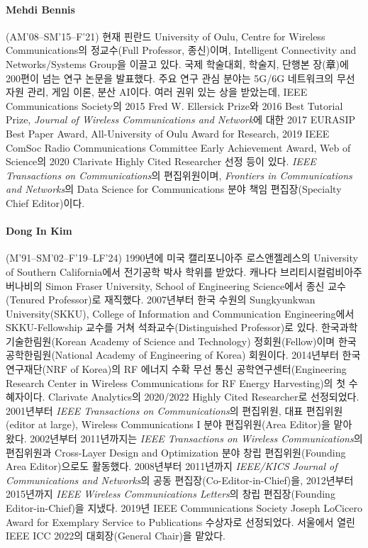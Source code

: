 \paragraph{Mehdi Bennis} (AM'08--SM'15--F'21)
현재 핀란드 University of Oulu, Centre for Wireless Communications의 정교수(Full Professor, 종신)이며, Intelligent Connectivity and Networks/Systems Group을 이끌고 있다.
국제 학술대회, 학술지, 단행본 장(章)에 200편이 넘는 연구 논문을 발표했다.
주요 연구 관심 분야는 5G/6G 네트워크의 무선 자원 관리, 게임 이론, 분산 AI이다.
여러 권위 있는 상을 받았는데, IEEE Communications Society의 2015 Fred W. Ellersick Prize와 2016 Best Tutorial Prize, \emph{Journal of Wireless Communications and Network}에 대한 2017 EURASIP Best Paper Award, All-University of Oulu Award for Research, 2019 IEEE ComSoc Radio Communications Committee Early Achievement Award, Web of Science의 2020 Clarivate Highly Cited Researcher 선정 등이 있다.
\emph{IEEE Transactions on Communications}의 편집위원이며, \emph{Frontiers in Communications and Networks}의 Data Science for Communications 분야 책임 편집장(Specialty Chief Editor)이다.

\paragraph{Dong In Kim} (M'91--SM'02--F'19--LF'24)
1990년에 미국 캘리포니아주 로스앤젤레스의 University of Southern California에서 전기공학 박사 학위를 받았다.
캐나다 브리티시컬럼비아주 버나비의 Simon Fraser University, School of Engineering Science에서 종신 교수(Tenured Professor)로 재직했다.
2007년부터 한국 수원의 Sungkyunkwan University(SKKU), College of Information and Communication Engineering에서 SKKU-Fellowship 교수를 거쳐 석좌교수(Distinguished Professor)로 있다.
한국과학기술한림원(Korean Academy of Science and Technology) 정회원(Fellow)이며 한국공학한림원(National Academy of Engineering of Korea) 회원이다.
2014년부터 한국연구재단(NRF of Korea)의 RF 에너지 수확 무선 통신 공학연구센터(Engineering Research Center in Wireless Communications for RF Energy Harvesting)의 첫 수혜자이다.
Clarivate Analytics의 2020/2022 Highly Cited Researcher로 선정되었다.
2001년부터 \emph{IEEE Transactions on Communications}의 편집위원, 대표 편집위원(editor at large), Wireless Communications I 분야 편집위원(Area Editor)을 맡아 왔다.
2002년부터 2011년까지는 \emph{IEEE Transactions on Wireless Communications}의 편집위원과 Cross-Layer Design and Optimization 분야 창립 편집위원(Founding Area Editor)으로도 활동했다.
2008년부터 2011년까지 \emph{IEEE/KICS Journal of Communications and Networks}의 공동 편집장(Co-Editor-in-Chief)을, 2012년부터 2015년까지 \emph{IEEE Wireless Communications Letters}의 창립 편집장(Founding Editor-in-Chief)을 지냈다.
2019년 IEEE Communications Society Joseph LoCicero Award for Exemplary Service to Publications 수상자로 선정되었다.
서울에서 열린 IEEE ICC 2022의 대회장(General Chair)을 맡았다.

